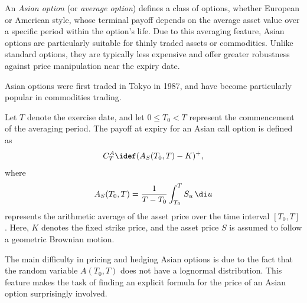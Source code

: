 An \emph{Asian option} (or \emph{average option}) defines a class of options, whether European or American style, whose terminal payoff depends on the average asset value over a specific period within the option's life. Due to this averaging feature, Asian options are particularly suitable for thinly traded assets or commodities. Unlike standard options, they are typically less expensive and offer greater robustness against price manipulation near the expiry date.

Asian options were first traded in Tokyo in 1987, and have become particularly popular in commodities trading.

Let \(T\) denote the exercise date, and let \(0 \le T_0 < T\) represent the commencement of the averaging period. The payoff at expiry for an Asian call option is defined as
\begin{equation} \label{eq:AsianCallPayoff}
    C_T^A \idef (A_S(T_0, T) - K)^+,
\end{equation}
where
\begin{equation} \label{eq:ArithmeticAverage}
    A_S(T_0, T) = \frac{1}{T - T_0} \int_{T_0}^T S_u \, \di u
\end{equation}
represents the arithmetic average of the asset price over the time interval \([T_0, T]\). Here, \(K\) denotes the fixed strike price, and the asset price \(S\) is assumed to follow a geometric Brownian motion.

The main difficulty in pricing and hedging Asian options is due to the fact that the random variable \(A(T_0, T)\) does not have a lognormal distribution. This feature makes the task of finding an explicit formula for the price of an Asian option surprisingly involved.

